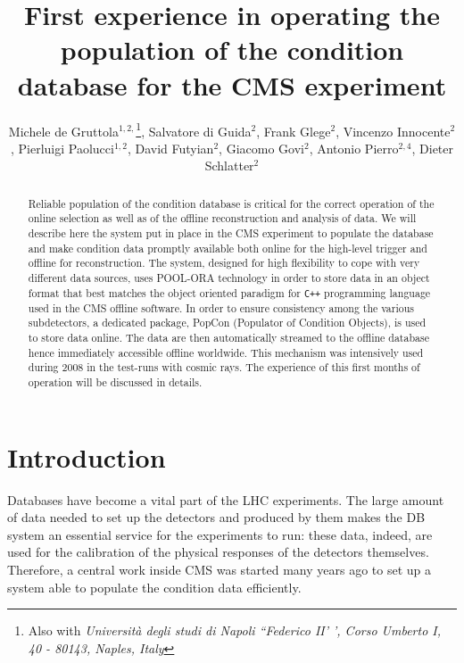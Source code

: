 \documentclass[a4paper]{jpconf}
\begin{document}
\title{First experience in operating the population of the condition database for the CMS experiment}
\author{Michele de Gruttola$^{1,2,}$\footnote[3]{Also with {\it{Universit\`a  degli studi di Napoli ``Federico II'
', Corso Umberto I, 40 - 80143, Naples, Italy}}}, Salvatore di Guida$^2$, Frank Glege$^2$, Vincenzo Innocente$^2$, Pierluigi Paolucci$^{1,2}$, David Futyian$^2$, Giacomo Govi$^2$, Antonio Pierro$^{2,4}$, Dieter Schlatter$^2$}
  


\address{$^1$ INFN Sezione di Napoli, Compl. Univ. Monte Sant'Angelo, via Cintia, I-80126, Naples, Italy}
\address{$^2$ CERN, CH 1211 - Geneve 23, Switzerland}
\address{$^4$ INFN Sezione di Bari - Bari University, Via Orabona 4, Bari 70126, Italy}


                                   
\begin{abstract}
Reliable population of the condition database is critical for the correct operation of the online selection as well as of the offline reconstruction and analysis of data. 
We will describe here the system put in place in the CMS experiment to populate the database and make condition data promptly available both online for the high-level trigger and offline for reconstruction. 
The system, designed for high flexibility to cope with very different data sources, uses POOL-ORA technology in order to store data in an object format that best matches the object oriented paradigm for \texttt{C++} programming language used in the CMS offline software. 
In order to ensure consistency among the various subdetectors, a dedicated package, PopCon (Populator of Condition Objects), is used to store data online. 
The data are then automatically streamed to the offline database hence immediately accessible offline worldwide. 
This mechanism was intensively used during 2008 in the test-runs with cosmic rays. 
The experience of this first months of operation will be discussed in details. 
\end{abstract}


\section{Introduction}
Databases have become a vital part of the LHC experiments. 
The large amount of data needed to set up the detectors and produced by them makes the DB system an essential service for the experiments to run: these data, indeed, are used for the calibration of the physical responses of the detectors themselves. 
Therefore, a central work inside CMS was started many years ago to set up a system able to populate the condition data efficiently. 
\end{document}
